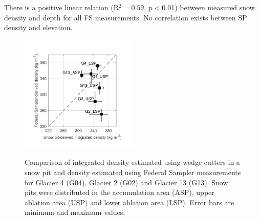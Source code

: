 \documentclass[twocolumn,letterpaper]{igs}
\begin{document}
There is a positive linear relation (R$^2= 0.59$, p$<$0.01) between measured snow density and depth for all FS measurements. No correlation exists between SP density and elevation.


\begin{figure}
	\centering
	\includegraphics[width =0.5\textwidth]{SPvsFS.pdf}\\
	\caption{Comparison of integrated density estimated using wedge cutters in a snow pit and density estimated using Federal Sampler measurements for Glacier 4 (G04), Glacier 2 (G02) and Glacier 13 (G13). Snow pits were distributed in the accumulation area (ASP), upper ablation area (USP) and lower ablation area (LSP). Error bars are minimum and maximum values.}
	\label{fig:density_pitVStube}
\end{figure}
\end{document}
